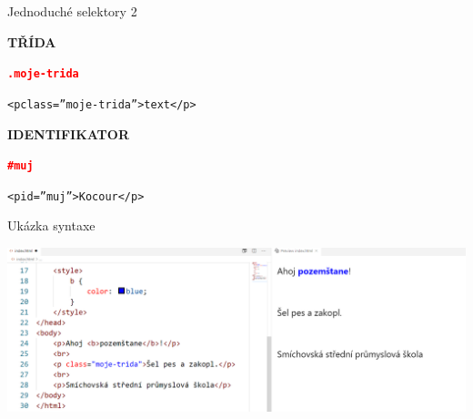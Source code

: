 \documentclass[aspectratio=1610]{beamer}
\begin{document}
\begin{frame}{Jednoduché selektory 2}
    \begin{multicols}{2}
        \centering

        \begin{cardTiny}
            \begin{center}
                \textbf{TŘÍDA}
            \end{center}

            \begin{flushleft}
                \begin{alltt}
                    \textbf{\textcolor{red}{.moje-trida}} \string{\\
                        \textcolor{blue}{color}: \textcolor{orange}{cyan};\\
                    \string}
                \end{alltt}
                \begin{alltt}
                    <p class=''moje-trida''>text</p>
                \end{alltt}
            \end{flushleft}
        \end{cardTiny}
        \begin{cardTiny}
            \begin{center}
                \textbf{IDENTIFIKATOR}
            \end{center}

            \begin{flushleft}
                \begin{alltt}
                    \textbf{\textcolor{red}{\#muj}} \string{\\
                        \textcolor{blue}{color}: \textcolor{orange}{lime};\\
                    \string}
                \end{alltt}
                \begin{alltt}
                    <p id=''muj''>Kocour</p>
                \end{alltt}
            \end{flushleft}
        \end{cardTiny}
    \end{multicols}
\end{frame}

\begin{frame}{Ukázka syntaxe}
    \begin{center}
        \includegraphics[width=\textwidth]{img/html-7-8-1.png}
    \end{center}
\end{frame}
\end{document}
